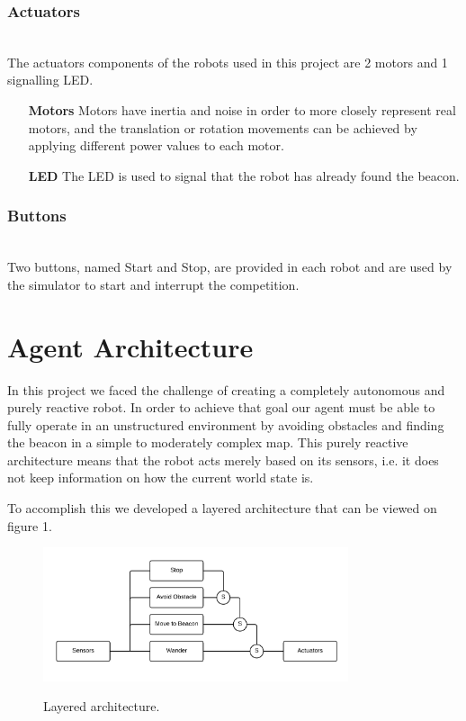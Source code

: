 \documentclass[oribibl]{llncs}
\begin{document}
\subsubsection{Actuators}\hfill \\
The actuators components of the robots used in this project are 2 motors and 1 signalling LED. 
\begin{itemize}
  \item[\textbf{Motors}]
Motors have inertia and noise in order to more closely represent real motors, and the translation or rotation movements can be achieved by applying different power values to each motor.
  \item[\textbf{LED}]
The LED is used to signal that the robot has already found the beacon.
\end{itemize}

\subsubsection{Buttons}\hfill \\
Two buttons, named Start and Stop, are provided in each robot and are used by the simulator to start and interrupt the competition.

\section{Agent Architecture}
In this project we faced the challenge of creating a completely autonomous and purely reactive robot. In order to achieve that goal our agent must be able to fully operate in an unstructured environment by avoiding obstacles and finding the beacon in a simple to moderately complex map.
This purely reactive architecture means that the robot acts merely based on its sensors, i.e. it does not keep information on how the current world state is.

To accomplish this we developed a layered architecture that can be viewed on figure 1.

\begin{figure}
  \centering
  \includegraphics[width=0.8\textwidth]{layer-architecture.png}
  \label{fig:layered}
  \caption{Layered architecture.}
\end{figure}
\end{document}
